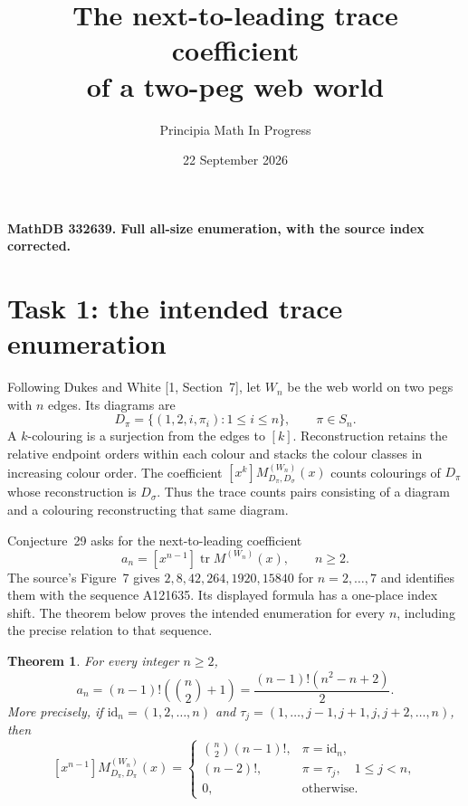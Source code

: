 \documentclass[11pt]{article}
\title{The next-to-leading trace coefficient\\of a two-peg web world}
\author{Principia Math In Progress}
\date{22 September 2026}
\newtheorem{theorem}{Theorem}
\newcommand{\tr}{\operatorname{tr}}
\begin{document}
\maketitle
\noindent\textbf{MathDB 332639. Full all-size enumeration, with the source index corrected.}

\section*{Task 1: the intended trace enumeration}
Following Dukes and White [1, Section~7], let \(W_n\) be the web world
on two pegs with \(n\) edges. Its diagrams are
\[
 D_\pi=\{(1,2,i,\pi_i):1\leq i\leq n\},\qquad \pi\in S_n.
\]
A \(k\)-colouring is a surjection from the edges to \([k]\).
Reconstruction retains the relative endpoint orders within each
colour and stacks the colour classes in increasing colour order.
The coefficient \([x^k]M^{(W_n)}_{D_\pi,D_\sigma}(x)\) counts
colourings of \(D_\pi\) whose reconstruction is \(D_\sigma\).
Thus the trace counts pairs consisting of a diagram and a
colouring reconstructing that same diagram.

Conjecture~29 asks for the next-to-leading coefficient
\[
 a_n=[x^{n-1}]\tr M^{(W_n)}(x),\qquad n\geq2.
\]
The source's Figure~7 gives \(2,8,42,264,1920,15840\) for
\(n=2,\ldots,7\) and identifies them with the sequence A121635.
Its displayed formula has a one-place index shift. The theorem
below proves the intended enumeration for every \(n\), including
the precise relation to that sequence.

\begin{theorem}
For every integer \(n\geq2\),
\[
 \boxed{\displaystyle
 a_n=(n-1)!\left(\binom n2+1\right)
      =\frac{(n-1)!(n^2-n+2)}2.}                         \tag{1}
\]
More precisely, if \(\mathrm{id}_n=(1,2,\ldots,n)\) and
\(\tau_j=(1,\ldots,j-1,j+1,j,j+2,\ldots,n)\), then
\[
 [x^{n-1}]M^{(W_n)}_{D_\pi,D_\pi}(x)=
 \begin{cases}
  \binom n2(n-1)!, & \pi=\mathrm{id}_n,\\
  (n-2)!, & \pi=\tau_j,\quad 1\leq j<n,\\
  0, & \text{otherwise}.
 \end{cases}                                            \tag{2}
\]
\end{theorem}
\end{document}
